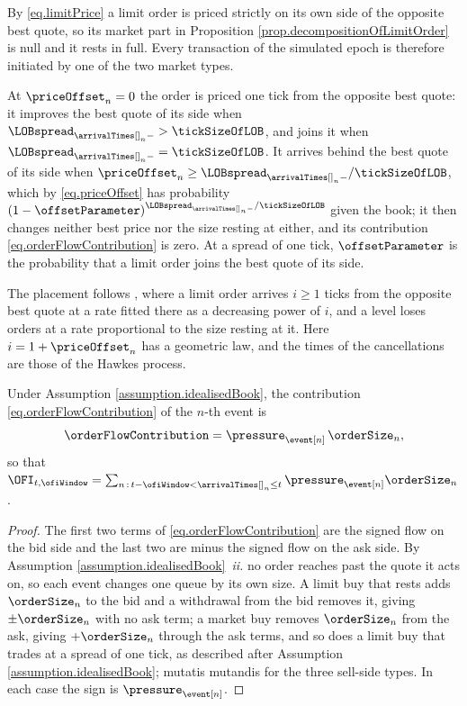 By \eqref{eq.limitPrice} a limit order is priced strictly on its own side of the opposite
best quote,
so its market part in Proposition \ref{prop.decompositionOfLimitOrder} is null
and it rests in full.
Every transaction of the simulated epoch is therefore initiated by one of the two market
types.

At $\priceOffset_n = 0$ the order is priced one tick from the opposite best quote:
it improves the best quote of its side when
$\LOBspread_{\arrivalTimes[]_n-} > \tickSizeOfLOB$,
and joins it when $\LOBspread_{\arrivalTimes[]_n-} = \tickSizeOfLOB$.
It arrives behind the best quote of its side when
$\priceOffset_n \geq \LOBspread_{\arrivalTimes[]_n-}/\tickSizeOfLOB$,
which by \eqref{eq.priceOffset} has probability
$(1-\offsetParameter)^{\LOBspread_{\arrivalTimes[]_n-}/\tickSizeOfLOB}$ given the book;
it then changes neither best price nor the size resting at either,
and its contribution \eqref{eq.orderFlowContribution} is zero.
At a spread of one tick,
$\offsetParameter$ is the probability that a limit order joins the best quote of its side.

The placement follows \cite{CST10sto},
where a limit order arrives $i \geq 1$ ticks from the opposite best quote
at a rate fitted there as a decreasing power of $i$,
and a level loses orders at a rate proportional to the size resting at it.
Here $i = 1 + \priceOffset_n$ has a geometric law,
and the times of the cancellations are those of the Hawkes process.

\begin{prop}\label{prop.signedSizeContribution}
 Under Assumption \ref{assumption.idealisedBook},
 the contribution \eqref{eq.orderFlowContribution} of the $n$-th event is
 \begin{equation}\label{eq.signedSizeContribution}
  \orderFlowContribution = \pressure_{\event[n]} \, \orderSize_n ,
 \end{equation}
 so that
 $\OFI_{t,\ofiWindow}
 = \sum_{n \, : \, t - \ofiWindow < \arrivalTimes[]_n \leq t}
 \pressure_{\event[n]} \orderSize_n$.
\end{prop}
\begin{proof}
 The first two terms of \eqref{eq.orderFlowContribution} are the signed flow on the bid side
 and the last two are minus the signed flow on the ask side.
 By Assumption \ref{assumption.idealisedBook}~\emph{ii.} no order reaches past the quote it
 acts on, so each event changes one queue by its own size.
 A limit buy that rests adds $\orderSize_n$ to the bid and a withdrawal from the bid
 removes it,
 giving $\pm\orderSize_n$ with no ask term;
 a market buy removes $\orderSize_n$ from the ask, giving $+\orderSize_n$ through the ask
 terms,
 and so does a limit buy that trades at a spread of one tick,
 as described after Assumption \ref{assumption.idealisedBook};
 mutatis mutandis for the three sell-side types.
 In each case the sign is $\pressure_{\event[n]}$.
\end{proof}

